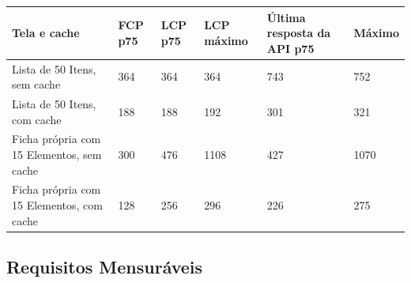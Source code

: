 \FloatBarrier
\begin{quadro}[h!]
\caption{Carregamento das telas no navegador a 10 Mbps, em milissegundos desde o início da navegação (n = 10 por linha)}
\label{quad:telasNavegador}
\footnotesize
\begin{tabular}{|p{4.6cm}|p{1.4cm}|p{1.4cm}|p{1.4cm}|p{2.6cm}|p{1.4cm}|}
\hline
\textbf{Tela e cache} & \textbf{FCP p75} & \textbf{LCP p75} & \textbf{LCP máximo} & \textbf{Última resposta da API p75} & \textbf{Máximo} \\ \hline
Lista de 50 Itens, sem cache & 364 & 364 & 364 & 743 & 752 \\ \hline
Lista de 50 Itens, com cache & 188 & 188 & 192 & 301 & 321 \\ \hline
Ficha própria com 15 Elementos, sem cache & 300 & 476 & 1108 & 427 & 1070 \\ \hline
Ficha própria com 15 Elementos, com cache & 128 & 256 & 296 & 226 & 275 \\ \hline
\end{tabular}
\end{quadro}
\FloatBarrier

\subsection{Requisitos Mensuráveis}

